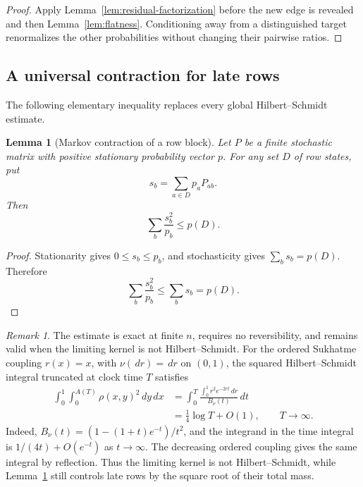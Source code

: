 \documentclass[11pt]{article}
\newtheorem{lemma}[theorem]{Lemma}
\theoremstyle{definition}
\theoremstyle{remark}
\newtheorem{remark}[theorem]{Remark}
\newcommand{\dd}{\,d}
\begin{document}
\begin{proof}
Apply Lemma~\ref{lem:residual-factorization} before the new edge is revealed and
then Lemma~\ref{lem:flatness}.  Conditioning away from a distinguished target
renormalizes the other probabilities without changing their pairwise ratios.
\end{proof}

\subsection{A universal contraction for late rows}

The following elementary inequality replaces every global Hilbert--Schmidt
estimate.

\begin{lemma}[Markov contraction of a row block]
\label{lem:row-block-contraction}
Let $P$ be a finite stochastic matrix with positive stationary probability
vector $p$.
For any set $D$ of row states, put
\[
  s_b=\sum_{a\in D}p_aP_{ab}.
\]
Then
\begin{equation}
  \sum_b\frac{s_b^2}{p_b}\le p(D).
  \label{eq:row-block-contraction}
\end{equation}
\end{lemma}

\begin{proof}
Stationarity gives $0\le s_b\le p_b$, and stochasticity gives
$\sum_b s_b=p(D)$.  Therefore
\[
 \sum_b\frac{s_b^2}{p_b}\le\sum_b s_b=p(D).
\]
\end{proof}

\begin{remark}
The estimate is exact at finite $n$, requires no reversibility, and remains
valid when the limiting kernel is not Hilbert--Schmidt.  For the ordered
Sukhatme coupling $r(x)=x$, with $\nu(\dd r)=\dd r$ on $(0,1)$, the squared
Hilbert--Schmidt integral truncated at clock time $T$ satisfies
\begin{align*}
 \int_0^1\int_0^{A(T)}\rho(x,y)^2\dd y\dd x
 &=\int_0^T
   \frac{\int_0^1r^2e^{-2rt}\dd r}{B_\nu(t)}\dd t\\
 &=\frac14\log T+O(1),\qquad T\to\infty.
\end{align*}
Indeed, $B_\nu(t)=(1-(1+t)e^{-t})/t^2$, and the integrand in the time
integral is $1/(4t)+O(e^{-t})$ as $t\to\infty$.  The decreasing ordered
coupling gives the same integral by reflection.  Thus the limiting kernel is
not Hilbert--Schmidt, while Lemma~\ref{lem:row-block-contraction} still controls
late rows by the square root of their total mass.
\end{remark}
\end{document}
